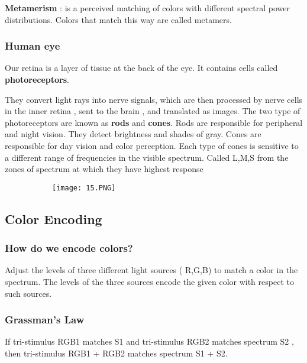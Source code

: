 \documentclass{article}
\begin{document}
\textbf{Metamerism} : is a perceived matching of colors with different spectral power distributions. Colors that match this way are called metamers.


\subsubsection{Human eye}

Our retina is a layer of tissue at the back of the eye. It contains cells called \textbf{photoreceptors}.

They convert light rays into nerve signals, which are then processed by nerve cells in the inner retina , sent to the brain , and translated as images.
The two type of photoreceptors are known as \textbf{rods} and \textbf{cones}.
Rods are responsible for peripheral and night vision. They detect brightness and shades of gray.
Cones are responsible for day vision and color perception.
Each type of cones is sensitive to a different range of frequencies in the visible spectrum. Called L,M,S from the zones of spectrum at which they have highest response

\begin{figure}[ht!]
  \centering
  \begin{subfigure}[b]{0.5\linewidth}
    \texttt{[image: 15.PNG]}
  \end{subfigure}
\end{figure}

\vspace{20mm}

\subsection{Color Encoding}
\subsubsection{How do we encode colors?}

Adjust the levels of three different light sources ( R,G,B) to match a color in the spectrum. The levels of the three sources encode the given color with respect to such sources.

\subsubsection{Grassman's Law}

If tri-stimulus RGB1 matches S1 and tri-stimulus RGB2 matches spectrum S2 , then tri-stimulus RGB1 + RGB2 matches spectrum S1 + S2.
\end{document}
